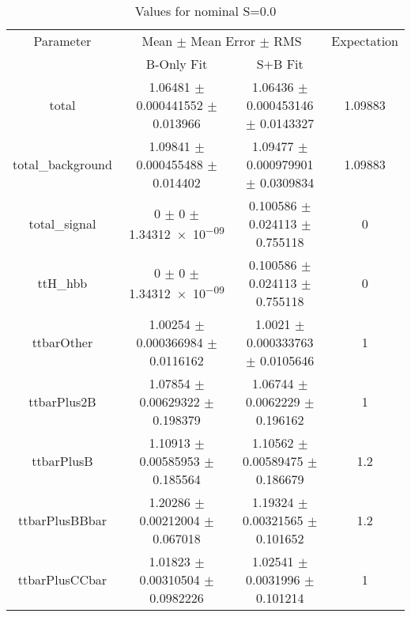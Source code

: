 \begin{table}
\centering
\caption{Values for nominal S=0.0}
\begin{tabular}{cccc}
\toprule
Parameter & \multicolumn{2}{c}{Mean $\pm$ Mean Error $\pm$ RMS} & Expectation\\
 & B-Only Fit & S+B Fit & \\
\midrule
total & \num{1.06481} $\pm$ \num{0.000441552} $\pm$ \num{0.013966} & \num{1.06436} $\pm$ \num{0.000453146} $\pm$ \num{0.0143327} & \num{1.09883}\\
total\_background & \num{1.09841} $\pm$ \num{0.000455488} $\pm$ \num{0.014402} & \num{1.09477} $\pm$ \num{0.000979901} $\pm$ \num{0.0309834} & \num{1.09883}\\
total\_signal & \num{0} $\pm$ \num{0} $\pm$ \num{1.34312e-09} & \num{0.100586} $\pm$ \num{0.024113} $\pm$ \num{0.755118} & \num{0}\\
ttH\_hbb & \num{0} $\pm$ \num{0} $\pm$ \num{1.34312e-09} & \num{0.100586} $\pm$ \num{0.024113} $\pm$ \num{0.755118} & \num{0}\\
ttbarOther & \num{1.00254} $\pm$ \num{0.000366984} $\pm$ \num{0.0116162} & \num{1.0021} $\pm$ \num{0.000333763} $\pm$ \num{0.0105646} & \num{1}\\
ttbarPlus2B & \num{1.07854} $\pm$ \num{0.00629322} $\pm$ \num{0.198379} & \num{1.06744} $\pm$ \num{0.0062229} $\pm$ \num{0.196162} & \num{1}\\
ttbarPlusB & \num{1.10913} $\pm$ \num{0.00585953} $\pm$ \num{0.185564} & \num{1.10562} $\pm$ \num{0.00589475} $\pm$ \num{0.186679} & \num{1.2}\\
ttbarPlusBBbar & \num{1.20286} $\pm$ \num{0.00212004} $\pm$ \num{0.067018} & \num{1.19324} $\pm$ \num{0.00321565} $\pm$ \num{0.101652} & \num{1.2}\\
ttbarPlusCCbar & \num{1.01823} $\pm$ \num{0.00310504} $\pm$ \num{0.0982226} & \num{1.02541} $\pm$ \num{0.0031996} $\pm$ \num{0.101214} & \num{1}\\
\bottomrule
\end{tabular}
\end{table}